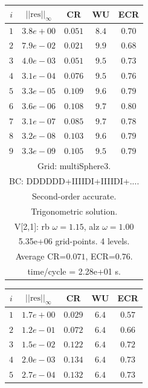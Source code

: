 \begin{table}[hbt]
\begin{center}
{\tablefontsize
\begin{tabular}{|c|c|c|c|c|} \hline 
 $i$   & $\vert\vert\mbox{res}\vert\vert_\infty$  &  CR     &  WU    & ECR  \\   \hline 
 $ 1$  & $ 3.8e+00$ & $0.051$ & $ 8.4$ & $0.70$ \\ 
 $ 2$  & $ 7.9e-02$ & $0.021$ & $ 9.9$ & $0.68$ \\ 
 $ 3$  & $ 4.0e-03$ & $0.051$ & $ 9.5$ & $0.73$ \\ 
 $ 4$  & $ 3.1e-04$ & $0.076$ & $ 9.5$ & $0.76$ \\ 
 $ 5$  & $ 3.3e-05$ & $0.109$ & $ 9.6$ & $0.79$ \\ 
 $ 6$  & $ 3.6e-06$ & $0.108$ & $ 9.7$ & $0.80$ \\ 
 $ 7$  & $ 3.1e-07$ & $0.085$ & $ 9.7$ & $0.78$ \\ 
 $ 8$  & $ 3.2e-08$ & $0.103$ & $ 9.6$ & $0.79$ \\ 
 $ 9$  & $ 3.3e-09$ & $0.105$ & $ 9.5$ & $0.79$ \\ 
\hline 
\multicolumn{5}{|c|}{Grid: multiSphere3.}  \\
\multicolumn{5}{|c|}{BC: DDDDDD+IIIIDI+IIIIDI+....}  \\
\multicolumn{5}{|c|}{Second-order accurate.}  \\
\multicolumn{5}{|c|}{Trigonometric solution.}  \\
\multicolumn{5}{|c|}{V[2,1]: rb $\omega=1.15$, alz $\omega=1.00$}  \\
\multicolumn{5}{|c|}{5.35e+06 grid-points. 4 levels.}  \\
\multicolumn{5}{|c|}{Average CR=$0.071$, ECR=$0.76$.}  \\
\multicolumn{5}{|c|}{time/cycle = 2.28e+01 s.}  \\
\hline 
\end{tabular}
\begin{tabular}{|c|c|c|c|c|} \hline 
 $i$   & $\vert\vert\mbox{res}\vert\vert_\infty$  &  CR     &  WU    & ECR  \\   \hline 
 $ 1$  & $ 1.7e+00$ & $0.029$ & $ 6.4$ & $0.57$ \\ 
 $ 2$  & $ 1.2e-01$ & $0.072$ & $ 6.4$ & $0.66$ \\ 
 $ 3$  & $ 1.5e-02$ & $0.122$ & $ 6.4$ & $0.72$ \\ 
 $ 4$  & $ 2.0e-03$ & $0.134$ & $ 6.4$ & $0.73$ \\ 
 $ 5$  & $ 2.7e-04$ & $0.132$ & $ 6.4$ & $0.73$ \\ 

\end{tabular}}
\end{center}
\end{table}
